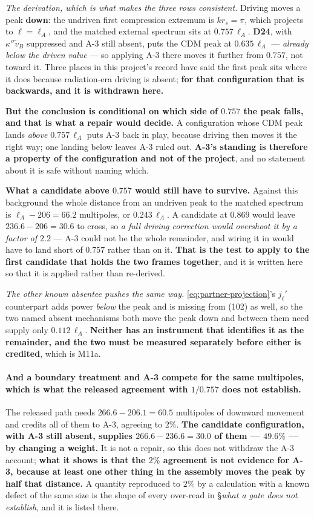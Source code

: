 \emph{The derivation, which is what makes the three rows consistent.} Driving
moves a peak \textbf{down}: the undriven first
compression extremum is $kr_s=\pi$, which projects to $\ell=\ell_A$, and the
matched external spectrum sits at $0.757\,\ell_A$. \textbf{D24}, with
$\kappa''\tilde v_B$ suppressed and A-3 still absent, puts the CDM peak at
$0.635\,\ell_A$ --- \emph{already below the driven value} --- so applying A-3
there moves it further from $0.757$, not toward it. Three places in this
project's record have said the first peak sits where it does because
radiation-era driving is absent; \textbf{for that configuration that is
backwards, and it is withdrawn here.}

\textbf{But the conclusion is conditional on which side of $0.757$ the peak
falls, and that is what a repair would decide.} A configuration whose CDM peak
lands \emph{above} $0.757\,\ell_A$ puts A-3 back in play, because driving then
moves it the right way; one landing below leaves A-3 ruled out. \textbf{A-3's
standing is therefore a property of the configuration and not of the project},
and no statement about it is safe without naming which.

\textbf{What a candidate above $0.757$ would still have to survive.} Against
this background the whole distance from an undriven peak to the matched
spectrum is $\ell_A-206=66.2$ multipoles, or $0.243\,\ell_A$. A candidate at
$0.869$ would leave $236.6-206=30.6$ to cross, so \emph{a full driving
correction would overshoot it by a factor of $2.2$} --- A-3 could not be the
whole remainder, and wiring it in would have to land short of $0.757$ rather
than on it. \textbf{That is the test to apply to the first candidate that
holds the two frames together}, and it is written here so that it is applied
rather than re-derived.

\emph{The other known absentee pushes the same way.} \eqref{eq:partner-projection}'s
$j_\ell'$ counterpart adds power \emph{below} the peak and is missing from
(102) as well, so the two named absent mechanisms both move the peak down and
between them need supply only $0.112\,\ell_A$. \textbf{Neither has an
instrument that identifies it as the remainder, and the two must be measured
separately before either is credited}, which is M11a.

\paragraph{And a boundary treatment and A-3 compete for the same multipoles,
which is what the released agreement with $1/0.757$ does not establish.} The
released path needs $266.6-206.1=60.5$ multipoles of downward movement and
credits all of them to A-3, agreeing to $2\%$. \textbf{The candidate
configuration, with A-3 still absent, supplies $266.6-236.6=30.0$ of them ---
$49.6\%$ --- by changing a weight.} It is not a repair, so this does not
withdraw the A-3 account; \textbf{what it shows is that the $2\%$ agreement is
not evidence for A-3, because at least one other thing in the assembly moves
the peak by half that distance.} A quantity reproduced to $2\%$ by a
calculation with a known defect of the same size is the shape of every
over-read in \S\emph{what a gate does not establish}, and it is listed there.

